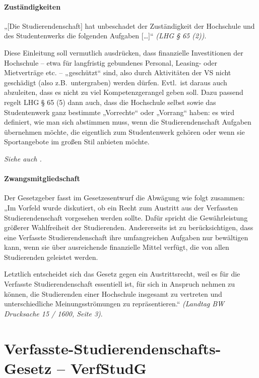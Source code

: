 \documentclass[
10pt,
a4paper,
twoside,								%
titlepage=false,							%
draft=false								%
]{scrartcl}
\begin{document}
\paragraph{Zuständigkeiten\label{Glossar:Zuständigkeiten}}

„[Die Studierendenschaft] hat unbeschadet der Zuständigkeit der Hochschule und des Studentenwerks die folgenden Aufgaben […]“ \textit{(LHG § 65 (2))}.

Diese Einleitung soll vermutlich ausdrücken, dass finanzielle Investitionen der Hochschule – etwa für langfristig gebundenes Personal, Leasing- oder Mietverträge etc. – „geschützt“ sind, also durch Aktivitäten der VS nicht geschädigt (also z.B.~untergraben) werden dürfen. Evtl.~ist daraus auch abzuleiten, dass es nicht zu viel Kompetenzgerangel geben soll. Dazu passend regelt LHG § 65 (5) dann auch, dass die Hochschule selbst sowie das Studentenwerk ganz bestimmte „Vorrechte“ oder „Vorrang“ haben: es wird definiert, wie man sich abstimmen muss, wenn die Studierendenschaft Aufgaben übernehmen möchte, die eigentlich zum Studentenwerk gehören oder wenn sie Sportangebote im großen Stil anbieten möchte.

\emph{Siehe auch .}



\paragraph{Zwangsmitgliedschaft}
Der Gesetzgeber fasst im Gesetzesentwurf die Abwägung wie folgt zusammen: „Im Vorfeld wurde diskutiert, ob ein Recht zum Austritt aus der Verfassten Studierendenschaft vorgesehen werden sollte. Dafür spricht die Gewährleistung größerer Wahlfreiheit der Studierenden. Andererseits ist zu berücksichtigen, dass eine Verfasste Studierendenschaft ihre umfangreichen Aufgaben nur bewältigen kann, wenn sie über ausreichende finanzielle Mittel verfügt, die von allen Studierenden geleistet werden.

Letztlich entscheidet sich das Gesetz gegen ein Austrittsrecht, weil es für die Verfasste Studierendenschaft essentiell ist, für sich in Anspruch nehmen zu können, die Studierenden einer Hochschule insgesamt zu vertreten und unterschiedliche
Meinungsströmungen zu repräsentieren.“ \textit{(Landtag BW Drucksache 15 / 1600, Seite 3)}.




\appendix
\newpage

\section{Verfasste-Studierendenschafts-Gesetz – VerfStudG}
\end{document}
